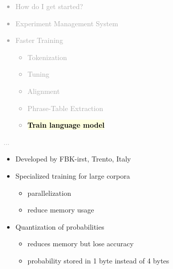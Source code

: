 \documentclass[landscape]{uedslides2C}
\newcommand{\currenttopic}[1]{\colorbox{lightyellow}{\textcolor{black}{\bf #1}}}
\begin{document}

\vspace{-5mm}
\textcolor{darkgrey}{
\begin{itemize} \itemsep -1mm
\item {How do I get started?}
\item {Experiment Management System}
\item {Faster Training}
  \begin{itemize}
  \item {Tokenization}
  \item {Tuning}
  \item {Alignment}
  \item {Phrase-Table Extraction}
  \item \currenttopic{Train language model}
  \end{itemize}
\end{itemize}
...
}

\vspace{10mm}
\begin{itemize}

\item Developed by FBK-irst, Trento, Italy

\item Specialized training for large corpora
	\begin{itemize}
	\item parallelization
	\item reduce memory usage
	\end{itemize}

\item Quantization of probabilities
	\begin{itemize}
	\item reduces memory but lose accuracy
	\item probability stored in 1 byte instead of 4 bytes
	\end{itemize}
\end{itemize}

\end{document}
